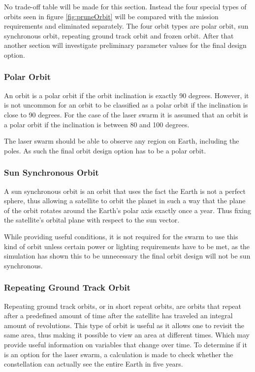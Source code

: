 No trade-off table will be made for this section. Instead the four special types of orbits seen in figure \ref{fig:pruneOrbit} will be compared with the mission requirements and eliminated separately. The four orbit types are polar orbit, sun synchronous orbit, repeating ground track orbit and frozen orbit. After that another section will investigate preliminary parameter values for the final design option.

\subsubsection{Polar Orbit}
An orbit is a polar orbit if the orbit inclination is exactly 90 degrees. However, it is not uncommon for an orbit to be classified as a polar orbit if the inclination is close to 90 degrees. For the case of the laser swarm it is assumed that an orbit is a polar orbit if the inclination is between 80 and 100 degrees.

The laser swarm should be able to observe any region on Earth, including the poles. As such the final orbit design option has to be a polar orbit.

\subsubsection{Sun Synchronous Orbit}
A sun synchronous orbit is an orbit that uses the fact the Earth is not a perfect sphere, thus allowing a satellite to orbit the planet in such a way that the plane of the orbit rotates around the Earth's polar axis exactly once a year. Thus fixing the satellite's orbital plane with respect to the sun vector.

While providing useful conditions, it is not required for the swarm to use this kind of orbit unless certain power or lighting requirements have to be met, as the simulation has shown this to be unnecessary the final orbit design will not be sun synchronous.

\subsubsection{Repeating Ground Track Orbit}
Repeating ground track orbits, or in short repeat orbits, are orbits that repeat after a predefined amount of time after the satellite has traveled an integral amount of revolutions. This type of orbit is useful as it allows one to revisit the same area, thus making it possible to view an area at different times. Which may provide useful information on variables that change over time.
To determine if it is an option for the laser swarm, a calculation is made to check whether the constellation can actually see the entire Earth in five years.

